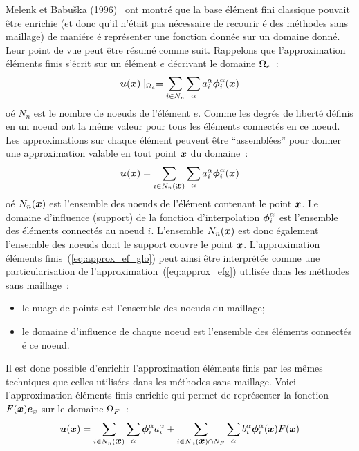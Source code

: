 Melenk et Babu\v{s}ka (1996)~\nocite{Babuska:PUFEM} ont montr\'e
que la base \'el\'ement fini classique pouvait \^etre enrichie
(et donc qu'il n'\'etait pas n\'ecessaire de recourir
\'e des m\'ethodes sans maillage)
de mani\'ere \'e repr\'esenter une fonction donn\'ee sur un domaine
donn\'e. Leur point de vue peut \^etre r\'esum\'e comme suit.
Rappelons que l'approximation \'el\'ements finis s'\'ecrit sur un \'el\'ement $e$ d\'ecrivant le domaine ${\Omega}_e$~:
\begin{equation}
  \label{eq:approx_ef2}
  \mbox{\boldmath $u$}(\mbox{\boldmath $x$}) \mid_{{\Omega}_e} = \sum_{i \in N_n} \sum_{\alpha} a_i^\alpha
  \mbox{\boldmath $\phi$}_i^\alpha(\mbox{\boldmath $x$})
\end{equation}
o\'e $N_n$ est le nombre de noeuds de l'\'el\'ement $e$.
Comme les degr\'es de libert\'e d\'efinis en un noeud ont la m\^eme
valeur pour tous les \'el\'ements connect\'es en ce noeud.
Les approximations sur chaque \'el\'ement
peuvent \^etre ``assembl\'ees''
pour donner
une approximation valable en tout point $\mbox{\boldmath $x$}$ du domaine~:
\begin{equation}
  \label{eq:approx_ef_glo}
  \mbox{\boldmath $u$}(\mbox{\boldmath $x$})  = \sum_{i \in N_n(\mbox{\boldmath $x$})} \sum_{\alpha} a_i^\alpha \mbox{\boldmath $\phi$}_i^\alpha(\mbox{\boldmath $x$})
\end{equation}
o\'e $N_n(\mbox{\boldmath $x$})$ est l'ensemble des noeuds de l'\'el\'ement contenant
le point $\mbox{\boldmath $x$}$. Le domaine d'influence (support) de la fonction
d'interpolation
 $\mbox{\boldmath $\phi$}_i^\alpha$ est l'ensemble des \'el\'ements connect\'es
au noeud $i$. L'ensemble $N_n(\mbox{\boldmath $x$})$ est donc \'egalement l'ensemble
des noeuds dont le support couvre le point $\mbox{\boldmath $x$}$.
L'approximation \'el\'ements finis~(\ref{eq:approx_ef_glo}) peut ainsi \^etre
interpr\'et\'ee comme une particularisation
de l'approximation~(\ref{eq:approx_efg}) utilis\'ee dans les m\'ethodes
sans maillage~:
\begin{itemize}
\item le nuage de points est l'ensemble des noeuds du maillage;
\item le domaine d'influence de chaque noeud est
l'ensemble des \'el\'ements connect\'es \'e ce noeud.
\end{itemize}
Il est donc possible d'enrichir l'approximation \'el\'ements
finis par les m\^emes techniques que celles utilis\'ees dans les m\'ethodes
sans maillage. Voici l'approximation \'el\'ements finis enrichie
qui permet de repr\'esenter la fonction $F(\mbox{\boldmath $x$}) \mbox{\boldmath $e$}_x$ sur le
domaine ${\Omega}_F$~:
\begin{equation}
  \label{eq:approx_ef_enrichi}
  \mbox{\boldmath $u$}(\mbox{\boldmath $x$})  = \sum_{i \in N_n(\mbox{\boldmath $x$})} \sum_{\alpha} \mbox{\boldmath $\phi$}_i^\alpha a_i^\alpha   +
  \sum_{i \in N_n(\mbox{\boldmath $x$}) \cap N_F}
  \sum_{\alpha} b_i^\alpha \mbox{\boldmath $\phi$}_i^\alpha(\mbox{\boldmath $x$}) F(\mbox{\boldmath $x$})
\end{equation}
